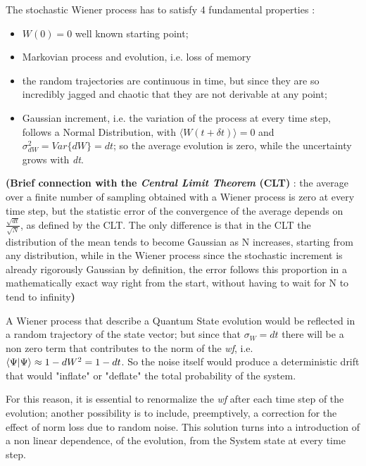 \documentclass[a4paper,12pt]{article}
\begin{document}
	The stochastic Wiener process has to satisfy 4 fundamental properties : 
	\begin{itemize}
		\item $ W (0) = 0 $ well known starting point;
		\item Markovian process and evolution, i.e. loss of memory
		\item the random trajectories are continuous in time, but since they are so incredibly jagged and chaotic that they are not derivable at any point;
		\item Gaussian increment, i.e. the variation of the process at every time step, follows a Normal Distribution, with $ \langle W (t + \delta t) \rangle = 0 $ and $ \sigma_{dW}^{2} = Var\{ dW \} = dt $; so the average evolution is zero, while the uncertainty grows with \textit{dt}.
	\end{itemize}
	\textbf{(Brief connection with the \textit{Central Limit Theorem} (CLT)} : the average over a finite number of sampling obtained with a Wiener process is zero at every time step, but the statistic error of the convergence of the average depends on $ \frac{\sqrt{dt}}{\sqrt{N}} $, as defined by the CLT. The only difference is that in the CLT the distribution of the mean tends to become Gaussian as N increases, starting from any distribution, while in the Wiener process since the stochastic increment is already rigorously Gaussian by definition, the error follows this proportion in a mathematically exact way right from the start, without having to wait for N to tend to infinity\textbf{)}
	
	A Wiener process that describe a Quantum State evolution would be reflected in a random trajectory of the state vector; but since that $ \sigma_{W} = dt $ there will be a non zero term that contributes to the norm of the \textit{wf}, i.e. $ \braket{\Psi | \Psi} \approx 1 - dW^{2} = 1 - dt $. So the noise itself would produce a deterministic drift that would "inflate" or "deflate" the total probability of the system.
	
	For this reason, it is essential to renormalize the \textit{wf} after each time step of the evolution; another possibility is to include, preemptively, a correction for the effect of norm loss due to random noise. This solution turns into a introduction of a non linear dependence, of the evolution, from the System state at every time step. 
\end{document}
